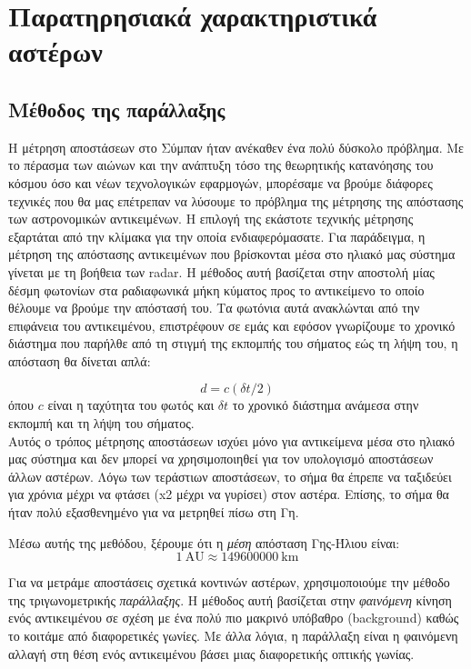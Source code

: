 \chapter{Παρατηρησιακά χαρακτηριστικά αστέρων}
\label{ch:Chapter2}
	{\hypersetup{linkcolor=black, pdfborder=0 0 1}
	\minitoc
	}

\section{Μέθοδος της παράλλαξης}

Η μέτρηση αποστάσεων στο Σύμπαν ήταν ανέκαθεν ένα πολύ δύσκολο πρόβλημα. Με το πέρασμα των αιώνων και την ανάπτυξη τόσο της θεωρητικής κατανόησης του κόσμου όσο και νέων τεχνολογικών εφαρμογών, μπορέσαμε να βρούμε διάφορες τεχνικές που θα μας επέτρεπαν να λύσουμε το πρόβλημα της μέτρησης της απόστασης των αστρονομικών αντικειμένων. Η επιλογή της εκάστοτε τεχνικής μέτρησης εξαρτάται από την κλίμακα για την οποία ενδιαφερόμασατε. Για παράδειγμα, η μέτρηση της απόστασης αντικειμένων που βρίσκονται μέσα στο ηλιακό μας σύστημα γίνεται με τη βοήθεια των radar. Η μέθοδος αυτή βασίζεται στην αποστολή μίας δέσμη φωτονίων στα ραδιαφωνικά μήκη κύματος προς το αντικείμενο το οποίο θέλουμε να βρούμε την απόστασή του. Τα φωτόνια αυτά ανακλώνται από την επιφάνεια του αντικειμένου, επιστρέφουν σε εμάς και εφόσον γνωρίζουμε το χρονικό διάστημα που παρήλθε από τη στιγμή της εκπομπής του σήματος εώς τη λήψη του, η απόσταση θα δίνεται απλά:

\begin{equation}
    d = c (\delta t / 2)
\end{equation}
όπου $c$ είναι η ταχύτητα του φωτός και $\delta t$ το χρονικό διάστημα ανάμεσα στην εκπομπή και τη λήψη του σήματος.
\\

Αυτός ο τρόπος μέτρησης αποστάσεων ισχύει μόνο για αντικείμενα μέσα στο ηλιακό μας σύστημα και δεν μπορεί να χρησιμοποιηθεί για τον υπολογισμό αποστάσεων άλλων αστέρων. Λόγω των τεράστιων αποστάσεων, το σήμα θα έπρεπε να ταξιδεύει για χρόνια μέχρι να φτάσει (x2 μέχρι να γυρίσει) στον αστέρα.
Επίσης, το σήμα θα ήταν πολύ εξασθενημένο για να μετρηθεί πίσω στη Γη.



Μέσω αυτής της μεθόδου, ξέρουμε ότι η \textit{μέση} απόσταση Γης-Ήλιου είναι: $$1 \ \text{AU} \approx 149600000 \ \text{km}$$

Για να μετράμε αποστάσεις σχετικά κοντινών αστέρων, χρησιμοποιούμε την μέθοδο της τριγωνομετρικής \textit{παράλλαξης}. Η μέθοδος αυτή βασίζεται στην \textit{φαινόμενη} κίνηση ενός αντικειμένου σε σχέση με ένα πολύ πιο μακρινό υπόβαθρο (background) καθώς το κοιτάμε από διαφορετικές γωνίες. Με άλλα λόγια, η παράλλαξη είναι η φαινόμενη αλλαγή στη θέση ενός αντικειμένου βάσει μιας διαφορετικής οπτικής γωνίας.\\ 

